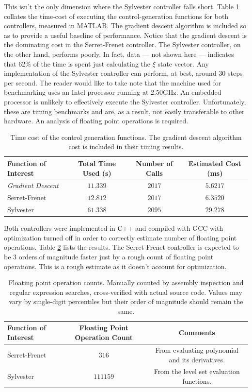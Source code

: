 \documentclass[oneside, 11pt]{book}
\begin{document}
This isn't the only dimension where the Sylvester controller falls short. Table \ref{tab:perf_simple} collates the time-cost of executing the control-generation functions for both controllers, measured in MATLAB. The gradient descent algorithm is included so as to provide a useful baseline of performance. Notice that the gradient descent is the dominating cost in the Serret-Frenet controller. The Sylvester controller, on the other hand, performs poorly. In fact, data --- not shown here --- indicates that 62\% of the time is spent just calculating the $\xi$ state vector. Any implementation of the Sylvester controller can perform, at best, around 30 steps per second. The reader would like to take note that the machine used for benchmarking uses an Intel processor running at 2.50GHz. An embedded processor is unlikely to effectively execute the Sylvester controller. Unfortunately, these are timing benchmarks and are, as a result, not easily transferable to other hardware. An analysis of floating point operations is required.
\begin{table}[!htbp]
    \centering
    \begin{tabular}{l|c|c|c}
        Function of Interest & Total Time Used (s) & Number of Calls & Estimated Cost (ms) \\ \hline
        \emph{Gradient Descent} & $11.339$ & $2017$ & $5.6217$\\ \hline
        Serret-Frenet & $12.812$ & $2017$ & $6.3520$ \\ \hline
        Sylvester & $61.338$ & $2095$ & $29.278$
    \end{tabular}
    \caption{Time cost of the control generation functions. The gradient descent algorithm cost is included in their timing results.}
    \label{tab:perf_simple}
\end{table}

Both controllers were implemented in C++ and compiled with GCC with optimization turned off in order to correctly estimate number of floating point operations. Table \ref{tab:perf_flop} lists the results. The Serret-Frenet controller is expected to be 3 orders of magnitude faster just by a rough count of floating point operations. This is a rough estimate as it doesn't account for optimization.

\begin{table}[!htbp]
    \centering
    \begin{tabular}{l|c|c}
        Function of Interest & Floating Point Operation Count & Comments\\ \hline
        Serret-Frenet & $316$ & From evaluating polynomial and its derivatives.\\  \hline
        Sylvester & $111159$ & From the level set evaluation functions.
    \end{tabular}
    \caption{Floating point operation counts. Manually counted by assembly inspection and regular expression searches, cross-verified with actual source code. Values may vary by single-digit percentiles but their order of magnitude should remain the same.}
    \label{tab:perf_flop}
\end{table}
\end{document}
